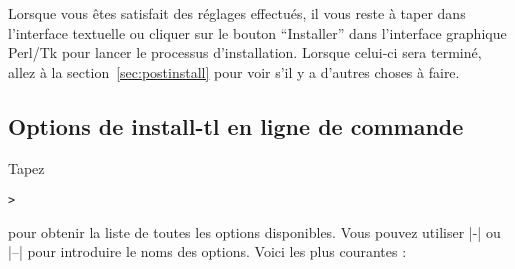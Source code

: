 \documentclass[german, english, french, 12pt]{article}
\begin{document}
Lorsque vous êtes satisfait des réglages effectués, il vous reste à taper
 dans l'interface textuelle ou cliquer sur le bouton \enquote{Installer}
dans l'interface graphique Perl/Tk pour lancer le processus d'installation.
Lorsque celui-ci sera terminé, allez à la section~\ref{sec:postinstall} pour
voir s'il y a d'autres choses à faire.

\subsection{Options de install-tl en ligne de commande}
\label{sec:cmdline}

Tapez
\begin{alltt}
> 
\end{alltt}
pour obtenir la liste de toutes les options disponibles. Vous pouvez utiliser
|-| ou |--| pour introduire le noms des options.  Voici les plus courantes :
\end{document}
